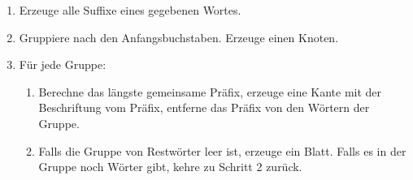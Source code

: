 \documentclass[12pt]{report}
\begin{document}
\begin{enumerate}
    \item Erzeuge alle Suffixe eines gegebenen Wortes.
    \item Gruppiere nach den Anfangsbuchstaben. Erzeuge einen Knoten.
    \item Für jede Gruppe:
    \begin{enumerate}
        \item Berechne das längste gemeinsame Präfix, erzeuge eine Kante mit der Beschriftung vom Präfix, entferne das Präfix von den Wörtern der Gruppe.
        \item Falls die Gruppe von Restwörter leer ist, erzeuge ein Blatt. Falls es in der Gruppe noch Wörter gibt, kehre zu Schritt 2 zurück.
    \end{enumerate}
\end{enumerate}
\end{document}
